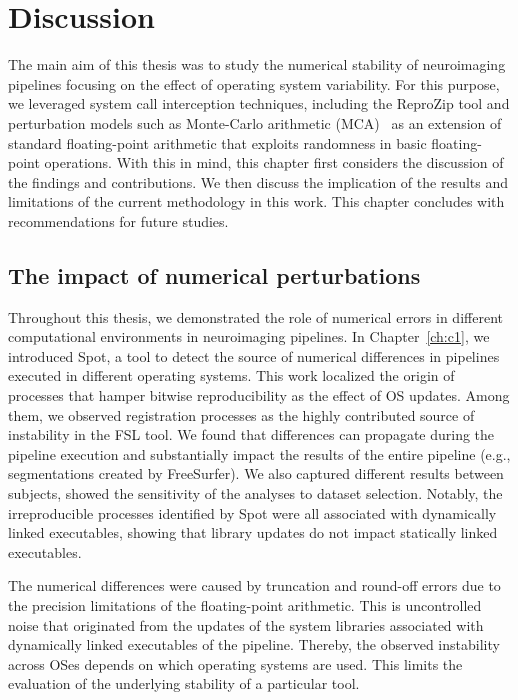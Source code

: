 \chapter{Discussion}
\label{ch:discussion}
\renewcommand\thesection{\@arabic\c@chapter.\@arabic\c@section}

The main aim of this thesis was to study the numerical stability of neuroimaging pipelines focusing on the effect
of operating system variability. For this purpose, we leveraged system call interception techniques, including
the ReproZip tool and perturbation models such as Monte-Carlo arithmetic (MCA)~\cite{Parker1997-qq} as an extension of
standard floating-point arithmetic that exploits randomness in basic floating-point operations.
With this in mind, this chapter first considers the discussion of the findings and contributions.
We then discuss the implication of the results and limitations of the current methodology in this work.
This chapter concludes with recommendations for future studies.


\section{The impact of numerical perturbations}

Throughout this thesis, we demonstrated the role of numerical errors in different computational environments in neuroimaging pipelines.
In Chapter~\ref{ch:c1}, we introduced Spot, a tool to detect the source of numerical differences in pipelines
executed in different operating systems. 
This work localized the origin of processes that hamper bitwise reproducibility as the effect of OS updates.
Among them, we observed registration processes as the highly contributed source of instability in the FSL tool. 
We found that differences can propagate during the pipeline execution and substantially impact
the results of the entire pipeline (e.g., segmentations created by FreeSurfer).
We also captured different results between subjects, showed the sensitivity of the analyses to dataset selection.
Notably, the irreproducible processes identified by Spot were all associated with dynamically linked executables,
showing that library updates do not impact statically linked executables.


The numerical differences were caused by truncation and round-off errors
due to the precision limitations of the floating-point arithmetic.
This is uncontrolled noise that originated from the updates of the system libraries associated with
dynamically linked executables of the pipeline. Thereby, the observed instability across OSes
depends on which operating systems are used. This limits the evaluation of the underlying stability of a particular tool.

